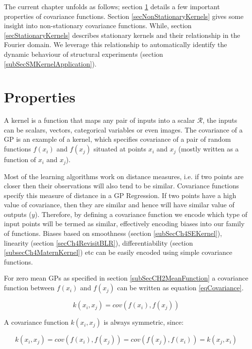 The current chapter unfolds as follows; section \ref{secPropertiesOfCovariance} details a few important properties of covariance functions. Section \ref{secNonStationaryKernels} gives some insight into non-stationary covariance functions. While, section \ref{secStationaryKernels} describes stationary kernels and their relationship in the Fourier domain. We leverage this relationship to automatically identify the dynamic behaviour of structural experiments (section \ref{subSecSMKernelApplication}). 

\section{Properties}\label{secPropertiesOfCovariance}
A kernel is a function that maps any pair of inputs into a scalar $\mathcal{R}$, the inputs can be scalars, vectors, categorical variables or even images. The covariance of a GP is an example of a kernel, which specifies covariance of a pair of random functions $f(x_{i})$ and $f(x_{j})$ situated at points $x_{i}$ and $x_{j}$ (mostly written as a function of $x_{i}$ and $x_{j}$). 

Most of the learning algorithms work on distance measures, i.e. if two points are closer then their observations will also tend to be similar. Covariance functions specify this measure of distance in a GP Regression. If two points have a high value of covariance, then they are similar and hence will have similar value of outputs ($y$). Therefore, by defining a covariance function we encode which type of input points will be termed as similar, effectively encoding biases into our family of functions. Biases based on smoothness (section \ref{subSecCh4SEKernel}), linearity (section \ref{secCh4RevisitBLR}), differentiability (section \ref{subsecCh4MaternKernel}) etc can be easily encoded using simple covariance functions.

For zero mean GPs as specified in section \ref{subSecCH2MeanFunction} a covariance function between $f(x_{i})$ and $f(x_{j})$ can be written as equation \ref{eqCovariance}.

\begin{equation}\label{eqCovariance}
    k(x_{i}, x_{j}) = cov(f(x_{i}), f(x_{j}))
\end{equation}

A covariance function $k(x_{i}, x_{j})$ is always symmetric, since: 

\begin{equation}\label{eqSymmetricCovariance}
    k(x_{i}, x_{j}) = cov(f(x_{i}), f(x_{j})) = cov(f(x_{j}), f(x_{i})) =  k(x_{j}, x_{i})
\end{equation}

